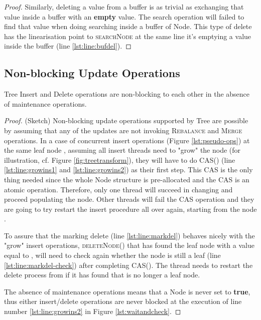 \begin{proof}
Similarly, deleting a value from a buffer is as trivial as exchanging that value
inside a buffer with an \textbf{empty} value. The search operation will failed
to find that value when doing searching inside a buffer of Node. This
type of delete has the linearisation point to \textsc{searchNode} at the same
line it's emptying a value inside the buffer (line \ref{lst:line:bufdel}).
\end{proof}

\subsection{Non-blocking Update Operations} 

\begin{lemma}
Tree Insert and Delete operations are
non-blocking to each other in the absence of maintenance operations.
\end{lemma}

\begin{proof} (Sketch)
Non-blocking update operations supported by Tree are possible by
assuming that any of the updates are not invoking \textsc{Rebalance} and
\textsc{Merge} operations. 
In a case of concurrent insert operations (Figure \ref{lst:pseudo-ops}) 
at the
same leaf node , assuming all insert threads need to "grow" the node 
(for illustration, cf. Figure \ref{fig:treetransform}), they
will have to do \textsc{CAS}() 
(line  \ref{lst:line:growins1} and \ref{lst:line:growins2}) as their
first step. This CAS is the only thing needed since the whole Node
structure is pre-allocated and the CAS is an atomic operation. Therefore, only
one thread will succeed in changing  and proceed populating the
 node. Other threads will fail the CAS operation and they are going to
try restart the insert procedure all over again, starting from the node .

To assure that the marking delete (line \ref{lst:line:markdel}) behaves nicely
with the "grow" insert operations, \textsc{deleteNode}() that has found
the leaf node  with a value equal to , will need to check again whether
the node is still a leaf (line \ref{lst:line:markdel-check}) after completing
\textsc{CAS}().
The thread needs to restart the delete process from  if it has found that 
is no longer a leaf node.

The absence of maintenance operations means that a Node  is 
never set to \textbf{true}, thus either insert/delete operations are never blocked
at the execution of line number \ref{lst:line:growins2} in Figure \ref{lst:waitandcheck}.
\end{proof}

